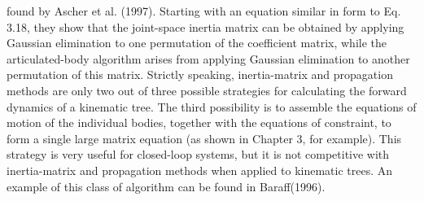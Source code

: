 \label{sec:6.6}
found by Ascher et al. (1997). Starting with an equation similar in form to Eq. 3.18, they show that the joint-space inertia matrix can be obtained by applying Gaussian elimination to one permutation of the coefficient matrix, while the articulated-body algorithm arises from applying Gaussian elimination to another permutation of this matrix. Strictly speaking, inertia-matrix and propagation methods are only two out of three possible strategies for calculating the forward dynamics of a kinematic tree. The third possibility is to assemble the equations of motion of the individual bodies, together with the equations of constraint, to form a single large matrix equation (as shown in Chapter 3, for example). This strategy is very useful for closed-loop systems, but it is not competitive with inertia-matrix and propagation methods when applied to kinematic trees. An example of this class of algorithm can be found in Baraff(1996).
